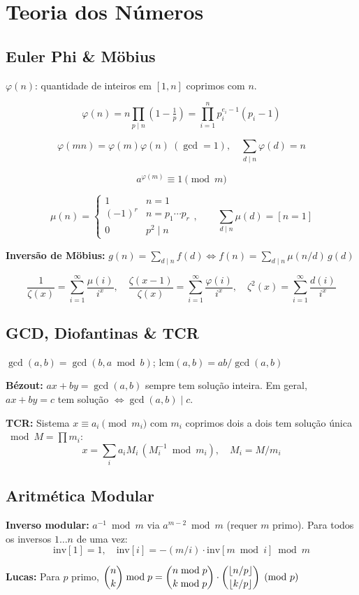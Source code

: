 \setlength{\parindent}{0pt}

\section{Teoria dos Números}

\subsection{Euler Phi \& Möbius}

$\varphi(n)$: quantidade de inteiros em $[1,n]$ coprimos com $n$.

\[\varphi(n)=n\prod_{p\mid n}\!\left(1-\tfrac1p\right)=\prod_{i=1}^n p_i^{e_i-1}(p_i-1)\]

\[\varphi(mn)=\varphi(m)\varphi(n)\ (\gcd=1), \quad \sum_{d\mid n}\varphi(d)=n\]

\[a^{\varphi(m)}\equiv1\pmod m\]

\[\mu(n)=\begin{cases}1&n=1\\(-1)^r&n=p_1\cdots p_r\\0&p^2\mid n\end{cases}, \qquad \sum_{d\mid n}\mu(d)=[n=1]\]

\textbf{Inversão de Möbius:} $g(n)=\sum_{d\mid n}f(d)\Leftrightarrow f(n)=\sum_{d\mid n}\mu(n/d)\,g(d)$

\[\frac{1}{\zeta(x)}=\sum_{i=1}^\infty\frac{\mu(i)}{i^x}, \quad \frac{\zeta(x-1)}{\zeta(x)}=\sum_{i=1}^\infty\frac{\varphi(i)}{i^x}, \quad \zeta^2(x)=\sum_{i=1}^\infty\frac{d(i)}{i^x}\]

\subsection{GCD, Diofantinas \& TCR}

$\gcd(a,b)=\gcd(b,a\bmod b)$; $\text{lcm}(a,b)=ab/\gcd(a,b)$

\vspace{6pt}

\textbf{Bézout:} $ax+by=\gcd(a,b)$ sempre tem solução inteira. Em geral, $ax+by=c$ tem solução $\Leftrightarrow\gcd(a,b)\mid c$.

\vspace{6pt}

\textbf{TCR:} Sistema $x\equiv a_i\pmod{m_i}$ com $m_i$ coprimos dois a dois tem solução única $\bmod M=\prod m_i$:
\[x=\sum_i a_i M_i\,(M_i^{-1}\bmod m_i), \quad M_i=M/m_i\]

\subsection{Aritmética Modular}

\textbf{Inverso modular:} $a^{-1}\bmod m$ via $a^{m-2}\bmod m$ (requer $m$ primo). Para todos os inversos $1\ldots n$ de uma vez:
\[\mathrm{inv}[1]=1, \quad \mathrm{inv}[i]=-(m/i)\cdot\mathrm{inv}[m\bmod i]\bmod m\]

\textbf{Lucas:} Para $p$ primo, $\dbinom{n}{k}\bmod p=\dbinom{n\bmod p}{k\bmod p}\cdot\dbinom{\lfloor n/p\rfloor}{\lfloor k/p\rfloor}\pmod p$
